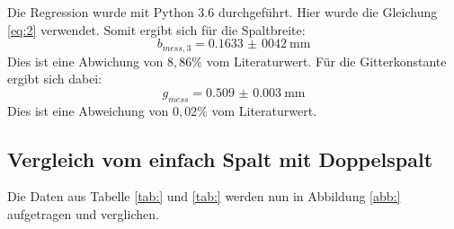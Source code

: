 Die Regression wurde mit Python 3.6 durchgeführt. Hier wurde die Gleichung \ref{eq:2} verwendet.
Somit ergibt sich für die Spaltbreite:
\begin{equation*}
  b_{mess,3} = \SI{0,1633(0042)}{\milli\metre}
\end{equation*}
Dies ist eine Abwichung von $8,86\%$ vom Literaturwert.
Für die Gitterkonstante ergibt sich dabei:
\begin{equation*}
  g_{mess} = \SI{0.509(3)}{\milli\metre}
\end{equation*}
Dies ist eine Abweichung von $0,02 \%$ vom Literaturwert.
\subsection{Vergleich vom einfach Spalt mit Doppelspalt}
Die Daten aus Tabelle \ref{tab:} und \ref{tab:} werden nun in Abbildung \ref{abb:}
aufgetragen und verglichen.
